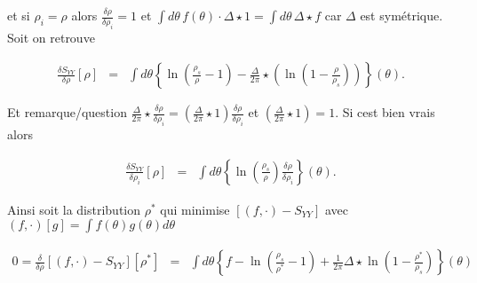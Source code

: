 	et si $\rho_i = \rho$ alors $\frac{\delta \rho }{ \delta \rho_i } = 1 $ et $\int d \theta \, f (\theta ) \cdot \Delta \star 1 = \int d \theta \,  \Delta \star f $ car $\Delta$ est symétrique. 	Soit on retrouve 

	
	\begin{eqnarray}
		\frac{ \delta S_{YY} }{ \delta \rho } [\rho ]  & = & \int d \theta \left \{ \ln \left ( \frac{ \rho_s}{ \rho} - 1 \right ) - \frac{ \Delta}{2 \pi} \star \left ( \ln \left ( 1 - \frac{ \rho}{ \rho_s}\right ) \right ) \right \} ( \theta )	.	
	\end{eqnarray}
	
	\begin{aff}
		Et remarque/question $  \frac{ \Delta}{2 \pi} \star \frac{\delta \rho }{ \delta \rho_i } = \left (\frac{ \Delta}{2 \pi} \star  1 \right ) \frac{\delta \rho }{ \delta \rho_i } $ et $\left (\frac{ \Delta}{2 \pi} \star  1 \right ) = 1 $. Si cest bien vrais alors 
	
		\begin{eqnarray}
			\frac{ \delta S_{YY} }{ \delta \rho_i } [\rho ]  & = & \int d \theta \left \{ \ln \left ( \frac{ \rho_s}{ \rho}\right )\frac{\delta \rho }{ \delta \rho_i } \right \}( \theta )	.	
		\end{eqnarray}	
	\end{aff}

	

	
	

	
	Ainsi soit la distribution $\rho^\ast$ qui minimise $\left [ (   f ,  \cdot  )  - S_{YY}  \right ]$ avec $(   f ,  \cdot  )[g] =  \int  f(\theta) g(\theta )  d\theta$
	 
	
	\begin{eqnarray}
		0 = \frac{\delta}{\delta \rho} \left [ (   f ,  \cdot  )  - S_{YY}  \right ][\rho^\ast ] & = & 	\int  d\theta\left \{ f - \ln \left ( \frac{ \rho_s}{ \rho^\ast } - 1 \right ) + \frac{1}{2 \pi} \Delta \star \ln \left ( 1 - \frac{ \rho^\ast }{ \rho_s}\right )  \right \} (\theta )
	\end{eqnarray}
	
	
	
